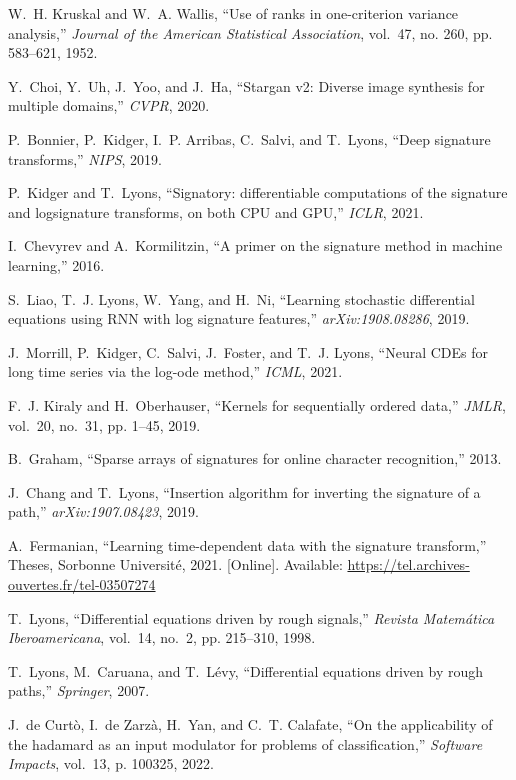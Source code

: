 \documentclass[lettersize,journal]{IEEEtran}
\begin{document}
\begin{thebibliography}{10}
W.~H. Kruskal and W.~A. Wallis, ``Use of ranks in one-criterion variance
  analysis,'' \emph{Journal of the American Statistical Association}, vol.~47,
  no. 260, pp. 583--621, 1952.

Y.~Choi, Y.~Uh, J.~Yoo, and J.~Ha, ``Stargan v2: Diverse image synthesis for
  multiple domains,'' \emph{CVPR}, 2020.

P.~Bonnier, P.~Kidger, I.~P. Arribas, C.~Salvi, and T.~Lyons, ``Deep signature
  transforms,'' \emph{NIPS}, 2019.

P.~Kidger and T.~Lyons, ``{S}ignatory: differentiable computations of the
  signature and logsignature transforms, on both {CPU} and {GPU},''
  \emph{ICLR}, 2021.

I.~Chevyrev and A.~Kormilitzin, ``A primer on the signature method in machine
  learning,'' 2016.

S.~Liao, T.~J. Lyons, W.~Yang, and H.~Ni, ``Learning stochastic differential
  equations using {RNN} with log signature features,'' \emph{arXiv:1908.08286},
  2019.

J.~Morrill, P.~Kidger, C.~Salvi, J.~Foster, and T.~J. Lyons, ``Neural {CDEs}
  for long time series via the log-ode method,'' \emph{ICML}, 2021.

F.~J. Kiraly and H.~Oberhauser, ``Kernels for sequentially ordered data,''
  \emph{JMLR}, vol.~20, no.~31, pp. 1--45, 2019.

B.~Graham, ``Sparse arrays of signatures for online character recognition,''
  2013.

J.~Chang and T.~Lyons, ``Insertion algorithm for inverting the signature of a
  path,'' \emph{arXiv:1907.08423}, 2019.

\BIBentryALTinterwordspacing
A.~Fermanian, ``{Learning time-dependent data with the signature transform},''
  Theses, {Sorbonne Universit{\'e}}, 2021. [Online]. Available:
  \url{https://tel.archives-ouvertes.fr/tel-03507274}
\BIBentrySTDinterwordspacing

T.~Lyons, ``Differential equations driven by rough signals,'' \emph{Revista
  Matem{\'a}tica Iberoamericana}, vol.~14, no.~2, pp. 215--310, 1998.

T.~Lyons, M.~Caruana, and T.~L{\'e}vy, ``Differential equations driven by rough
  paths,'' \emph{Springer}, 2007.

J.~{de Curtò}, I.~{de Zarzà}, H.~Yan, and C.~T. Calafate, ``On the
  applicability of the hadamard as an input modulator for problems of
  classification,'' \emph{Software Impacts}, vol.~13, p. 100325, 2022.

\end{thebibliography}
 
\end{document}
